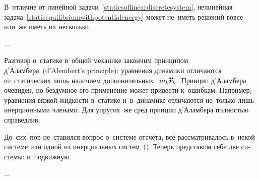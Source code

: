 \begin{otherlanguage}{russian}
В~отличие от линейной задачи~\eqref{staticsoflineardiscretesystem}, нелинейная задача~\eqref{staticequilibriumwithpotentialenergy} может не~иметь решений вовсе или~же иметь их н\'{е}сколько.

...

Разговор о~статике в~общей механике закончим принципом \hbox{д’\hspace{-0.2ex}Аламбера}~(\hbox{d’\hspace{-0.2ex}Alembert}’s principle): уравнения динамики отличаются от~статических лишь наличием дополнительных ~${m_k \mathdotdotabove{\bm{r}}_k}$. Принцип \hbox{д’\hspace{-0.2ex}Аламбера} очевиден, но бездумное его применение может привести к~ошибкам. Например, уравнения вязкой жидкости в~статике и~в~динамике отличаются не~только лишь инерционными членами. Для упругих~же сред принцип \hbox{д’\hspace{-0.2ex}Аламбера} полностью справедлив.

\end{otherlanguage}



\label{para:mechanicsofrelativemotion}

\begin{otherlanguage}{russian}

До~сих~пор не~ставился вопрос о~системе отсчёта, всё рассматривалось в~некой  системе или одной из инерциальных систем~(). Теперь представим себе две системы:  и~подвижную

...



\end{otherlanguage}



